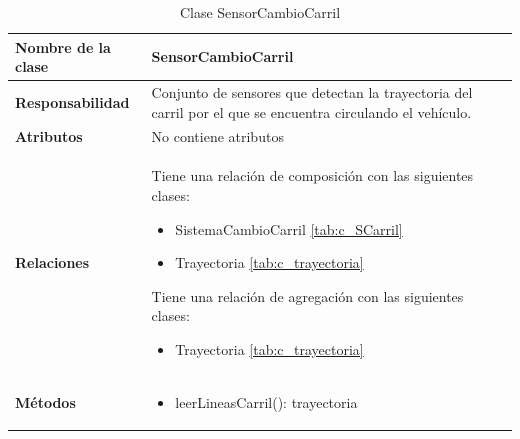 








\begin{table}[h]
\begin{center}
\begin{tabular}{p{} p{11cm}}
\textbf{Nombre de la clase} &  SensorCambioCarril\\ \hline  \hline
\textbf{Responsabilidad} &  Conjunto de sensores que detectan la trayectoria del carril por el que se encuentra circulando el vehículo. \\ \hline
\textbf{Atributos} & No contiene atributos
                      \\ \hline
\textbf{Relaciones} & \par Tiene una relación de composición con las siguientes clases:
                      \begin{itemize}
                        \item SistemaCambioCarril \ref{tab:c_SCarril}
                        \item Trayectoria \ref{tab:c_trayectoria}
                      \end{itemize}

                      \par Tiene una relación de agregación con las siguientes clases:
                      \begin{itemize}
                        \item Trayectoria \ref{tab:c_trayectoria}
                      \end{itemize}
                      \\ \hline

\textbf{Métodos} &  \begin{itemize}
                      \item leerLineasCarril(): trayectoria
                      \end{itemize}\\ \hline
\end{tabular}
\caption{Clase SensorCambioCarril}
\label{tab:c_SensorCC}
\end{center}
\end{table}








